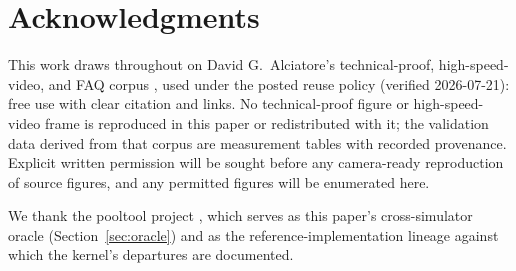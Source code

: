 \section*{Acknowledgments}
\label{sec:acknowledgments}

This work draws throughout on David G.~Alciatore's technical-proof,
high-speed-video, and FAQ corpus
\citep{alciatore2008coriolis,alciatore_tp_catalog,%
alciatore_hsv_catalog,alciatore_faq}, used under the posted reuse policy
(verified 2026-07-21): free use with clear citation and links. No
technical-proof figure or high-speed-video frame is reproduced in this
paper or redistributed with it; the validation data derived
from that corpus are measurement tables with recorded provenance.
Explicit written permission will be sought before any camera-ready
reproduction of source figures, and any permitted figures will be
enumerated here.

We thank the pooltool project \citep{kiefl2024pooltool}, which serves as
this paper's cross-simulator oracle (Section~\ref{sec:oracle}) and as the
reference-implementation lineage against which the kernel's departures
are documented.
